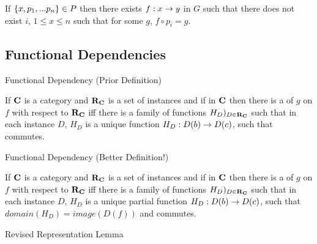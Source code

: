 \documentclass[xcolor=pst,dvips]{beamer}
\begin{document}
\begin{frame}
\scmonosketchwording 

 If $\left\{x,p_1,...p_n\right\}\in P$ then there exists $f: x \rightarrow y$ in $G$ such that there does not exist $i$, $1 \leq x \leq n$
such that for some $g$, $f \circ p_i = g$. 

\end{frame}

\subsection{Functional Dependencies}
\begin{frame} {Functional Dependency (Prior Definition)}
\begin{definition}
If $\textbf{C}$ is a category and $\textbf{R}_{\textbf{C}}$ is a set of instances and if \fgsourcediagram
in $\textbf{C}$ then there is a   of $g$ on $f$ with respect to $\textbf{R}_{\textbf{C}}$ iff
there is a family of functions $H_D)_{D \in \textbf{R}_{\textbf{C}}}$ such that 
in each instance $D$, $H_D$ is a unique function $H_D: D(b) \rightarrow D(c)$, such that 
 commutes.
\end{definition}
\end{frame}

\begin{frame} {Functional Dependency (Better Definition!)}
\begin{definition}
If $\textbf{C}$ is a category and $\textbf{R}_{\textbf{C}}$ is a set of instances and if \fgsourcediagram
in $\textbf{C}$ then there is a   of $g$ on $f$ with respect to $\textbf{R}_{\textbf{C}}$ iff
there is a family of functions $H_D)_{D \in \textbf{R}_{\textbf{C}}}$ such that 
in each instance $D$, $H_D$ is a unique partial function $H_D: D(b) \rightarrow D(c)$, such that
$domain(H_D) = image(D(f))$ and
 commutes.
\end{definition}
\end{frame}

\begin{frame}{Revised Representation Lemma}


\end{frame}
\end{document}
